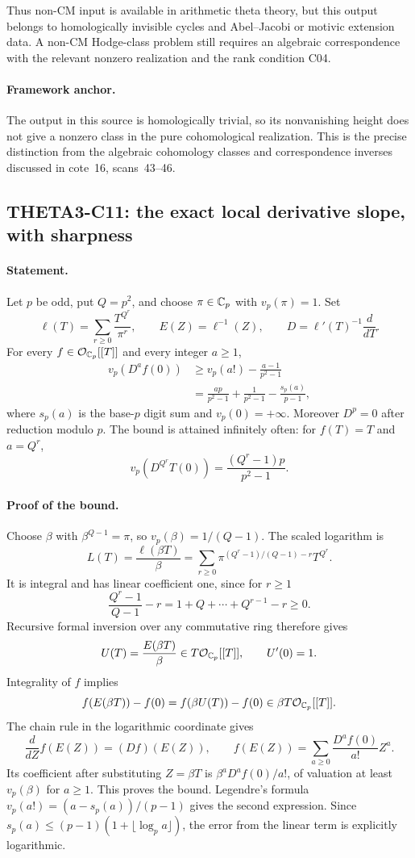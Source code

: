 \documentclass[11pt]{article}
\theoremstyle{definition}\newtheorem{definition}[theorem]{Definition}\newtheorem{remark}[theorem]{Remark}
\begin{document}
Thus non-CM input is available in arithmetic theta theory, but this
output belongs to homologically invisible cycles and
Abel--Jacobi or motivic extension data. A non-CM Hodge-class problem
still requires an algebraic correspondence with the relevant
nonzero realization and the rank condition C04.

\paragraph{Framework anchor.}
The output in this source is homologically trivial, so its nonvanishing
height does not give a nonzero class in the pure cohomological realization.
This is the precise distinction from the algebraic cohomology classes
and correspondence inverses discussed in cote~16, scans~43--46.

\subsection{THETA3-C11: the exact local derivative slope, with sharpness}\label{C11}

\paragraph{Statement.}
Let $p$ be odd, put $Q=p^2$, and choose $\pi\in\mathbb C_p$ with
$v_p(\pi)=1$. Set
\[
 \ell(T)=\sum_{r\geq0}\frac{T^{Q^r}}{\pi^r},\qquad
 E(Z)=\ell^{-1}(Z),\qquad D=\ell'(T)^{-1}\frac{d}{dT}.
\]
For every $f\in\mathcal O_{\mathbb C_p}[[T]]$ and every integer $a\geq1$,
\begin{align*}
 v_p(D^af(0))
 &\geq v_p(a!)-\frac{a-1}{p^2-1}\\
 &=\frac{ap}{p^2-1}+\frac1{p^2-1}
                     -\frac{s_p(a)}{p-1},
\end{align*}
where $s_p(a)$ is the base-$p$ digit sum and $v_p(0)=+\infty$.
Moreover $D^p=0$ after reduction modulo $p$.
The bound is attained infinitely often: for $f(T)=T$ and $a=Q^r$,
\[
 v_p(D^{Q^r}T(0))=\frac{(Q^r-1)p}{p^2-1}.
\]

\paragraph{Proof of the bound.}
Choose $\beta$ with $\beta^{Q-1}=\pi$, so
$v_p(\beta)=1/(Q-1)$. The scaled logarithm is
\[
 L(T)=\frac{\ell(\beta T)}\beta
 =\sum_{r\geq0}
     \pi^{(Q^r-1)/(Q-1)-r}T^{Q^r}.
\]
It is integral and has linear coefficient one, since for $r\geq1$
\[
 \frac{Q^r-1}{Q-1}-r=1+Q+\cdots+Q^{r-1}-r\geq0.
\]
Recursive formal inversion over any commutative ring therefore gives
\[
 U(T)=\frac{E(\beta T)}\beta
       \in T\mathcal O_{\mathbb C_p}[[T]],\qquad U'(0)=1.
\]
Integrality of $f$ implies
\[
 f(E(\beta T))-f(0)=f(\beta U(T))-f(0)
                         \in\beta T\mathcal O_{\mathbb C_p}[[T]].
\]
The chain rule in the logarithmic coordinate gives
\[
 \frac{d}{dZ}f(E(Z))=(Df)(E(Z)),\qquad
 f(E(Z))=\sum_{a\geq0}\frac{D^af(0)}{a!}Z^a.
\]
Its coefficient after substituting $Z=\beta T$ is
$\beta^aD^af(0)/a!$, of valuation at least $v_p(\beta)$ for
$a\geq1$. This proves the bound. Legendre's formula
$v_p(a!)=(a-s_p(a))/(p-1)$ gives the second expression. Since
$s_p(a)\leq(p-1)(1+\lfloor\log_pa\rfloor)$, the error from the
linear term is explicitly logarithmic.
\end{document}
